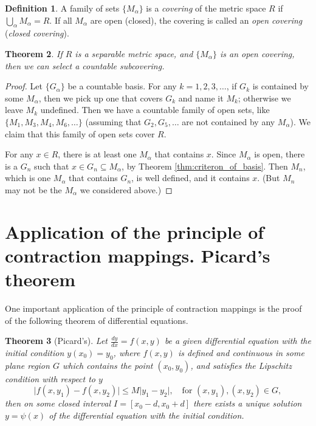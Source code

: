 \documentclass[a4paper,12pt]{article}
\newtheorem{thm}{Theorem}[section]
\theoremstyle{definition}
\newtheorem{defn}[thm]{Definition}
\theoremstyle{remark}
\begin{document}
\begin{defn}
  A family of sets $\{ M_{\alpha} \}$ is a \emph{covering} of the metric space $R$ if $\bigcup_{\alpha} M_{\alpha} = R$. If all $M_{\alpha}$ are open (closed), the covering is called an \emph{open covering} (\emph{closed covering}).
\end{defn}

\begin{thm}
  If $R$ is a separable metric space, and $\{ M_{\alpha} \}$ is an open covering, then we can select a countable subcovering.
\end{thm}

\begin{proof}
  Let $\{ G_{\alpha} \}$ be a countable basis. For any $k = 1, 2, 3, \dotsc$, if $G_k$ is contained by some $M_{\alpha}$, then we pick up one that covers $G_k$ and name it $M_k$; otherwise we leave $M_k$ undefined. Then we have a countable family of open sets, like $\{ M_1, M_3, M_4, M_6, \dotsc \}$ (assuming that $G_2, G_5, \dotsc$ are not contained by any $M_{\alpha}$). We claim that this family of open sets cover $R$.

  For any $x \in R$, there is at least one $M_{\alpha}$ that contains $x$. Since $M_{\alpha}$ is open, there is a $G_n$ such that $x \in G_n \subseteq M_{\alpha}$, by Theorem \ref{thm:criteron_of_basis}. Then $M_n$, which is one $M_{\alpha}$ that contains $G_n$, is well defined, and it contains $x$. (But $M_n$ may not be the $M_{\alpha}$ we considered above.)
\end{proof}

\section{Application of the principle of contraction mappings. Picard's theorem}

One important application of the principle of contraction mappings is the proof of the following theorem of differential equations.
\begin{thm}[Picard's]
  Let $\frac{dy}{dx} = f(x, y)$ be a given differential equation with the initial condition $y(x_0) = y_0$, where $f(x, y)$ is defined and continuous in some plane region $G$ which contains the point $(x_0, y_0)$, and satisfies the Lipschitz condition with respect to $y$
  \begin{equation*}
    \lvert f(x, y_1) - f(x, y_2) \rvert \leq M \lvert y_1 - y_2 \rvert, \quad \text{for $(x, y_1), (x, y_2) \in G$},
  \end{equation*}
  then on some closed interval $I = [x_0 - d, x_0 + d]$ there exists a unique solution $y = \psi(x)$ of the differential equation with the initial condition.
\end{thm}
\end{document}
